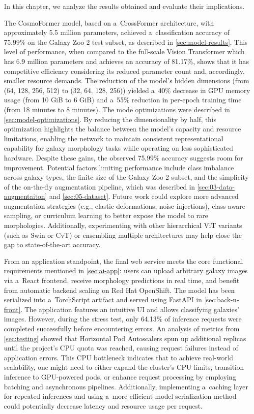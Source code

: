 In this chapter, we analyze the results obtained and evaluate their implications.

The CosmoFormer model, based on a~CrossFormer architecture, with approximately 5.5 million parameters, achieved a~classification accuracy of 75.99\% on the Galaxy Zoo 2 test subset, as described in \autoref{sec:model-results}. This level of performance, when compared to the full-scale Vision Transformer which has 6.9 million parameters and achieves an accuracy of 81.17\%, shows that it has competitive efficiency considering its reduced parameter count and, accordingly, smaller resource demands. The reduction of the model’s hidden dimensions (from (64, 128, 256, 512) to (32, 64, 128, 256)) yielded a~40\% decrease in GPU memory usage (from 10 GiB to 6 GiB) and a~55\% reduction in per-epoch training time (from 18 minutes to 8 minutes). The mode optimizations were described in \autoref{sec:model-optimizations}. By reducing the dimensionality by half, this optimization highlights the balance between the model’s capacity and resource limitations, enabling the network to maintain consistent representational capability for galaxy morphology tasks while operating on less sophisticated hardware. Despite these gains, the observed 75.99\% accuracy suggests room for improvement. Potential factors limiting performance include class imbalance across galaxy types, the finite size of the Galaxy Zoo 2 subset, and the simplicity of the on-the-fly augmentation pipeline, which was described in \autoref{sec:03-data-augmentaiton} and \autoref{sec:05-dataset}. Future work could explore more advanced augmentation strategies (e.g., elastic deformations, noise injections), class-aware sampling, or curriculum learning to better expose the model to rare morphologies. Additionally, experimenting with other hierarchical ViT variants (such as Swin or CvT) or ensembling multiple architectures may help close the gap to state-of-the-art accuracy.

From an application standpoint, the final web service meets the core functional requirements mentioned in \autoref{sec:ai-app}: users can upload arbitrary galaxy images via a~React frontend, receive morphology predictions in real time, and benefit from automatic backend scaling on Red Hat OpenShift. The model has been serialized into a~TorchScript artifact and served using FastAPI in \autoref{sec:back-n-front}. The application features an intuitive UI and allows classifying galaxies' images. However, during the stress test, only 64.13\% of inference requests were completed successfully before encountering errors. An analysis of metrics from \autoref{sec:testing} showed that Horizontal Pod Autoscalers spun up additional replicas until the project's CPU quota was reached, causing request failures instead of application errors. This CPU bottleneck indicates that to achieve real-world scalability, one might need to either expand the cluster's CPU limits, transition inference to GPU-powered pods, or enhance request processing by employing batching and asynchronous pipelines. Additionally, implementing a~caching layer for repeated inferences and using a~more efficient model serialization method could potentially decrease latency and resource usage per request.

